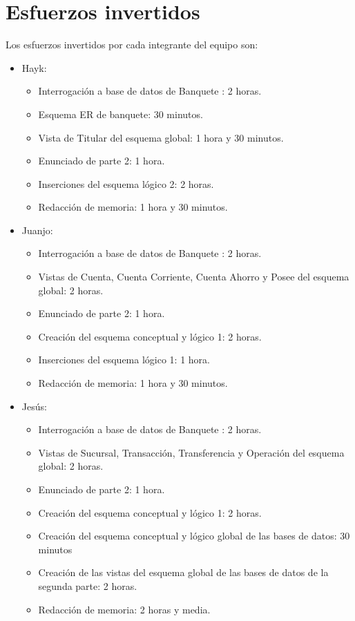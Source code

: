 \documentclass{article}
\begin{document}
\section{Esfuerzos invertidos}
Los esfuerzos invertidos por cada integrante del equipo son:
\begin{itemize}
\item Hayk:
\begin{itemize}
\item Interrogación a base de datos de Banquete : 2 horas.
\item Esquema ER de banquete: 30 minutos.
\item Vista de Titular del esquema global: 1 hora y 30 minutos.
\item Enunciado de parte 2: 1 hora.
\item Inserciones del esquema lógico 2: 2 horas.
\item Redacción de memoria: 1 hora y 30 minutos.
\end{itemize}

\item Juanjo:	
\begin{itemize}
\item Interrogación a base de datos de Banquete : 2 horas.
\item Vistas de Cuenta, Cuenta Corriente, Cuenta Ahorro y Posee del esquema global: 2 horas.
\item Enunciado de parte 2: 1 hora.
\item Creación del esquema conceptual y lógico 1: 2 horas.
\item Inserciones del esquema lógico 1: 1 hora.
\item Redacción de memoria: 1 hora y 30 minutos.
\end{itemize}

\item Jesús:
\begin{itemize}
\item Interrogación a base de datos de Banquete : 2 horas.
\item Vistas de Sucursal, Transacción, Transferencia y Operación del esquema global: 2 horas.
\item Enunciado de parte 2: 1 hora.
\item Creación del esquema conceptual y lógico 1: 2 horas.
\item Creación del esquema conceptual y lógico global de las bases de datos: 30 minutos
\item Creación de las vistas del esquema global de las bases de datos de la segunda parte: 2 horas.
\item Redacción de memoria: 2 horas y media.
\end{itemize}


\end{itemize}
\end{document}
